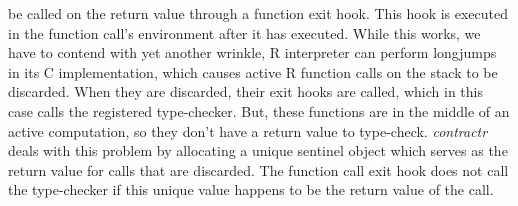 \documentclass[acmsmall,review,anonymous]{acmart}\settopmatter{printfolios=true,printccs=false,printacmref=false}
\newcommand{\contractr}{\emph{contractr}\xspace} %
\begin{document}
\begin{itemize}
  be called on the return value through a function exit hook. This hook is
  executed in the function call's environment after it has executed. While
  this works, we have to contend with yet another wrinkle, R interpreter can
  perform longjumps in its C implementation, which causes active R function
  calls on the stack to be discarded. When they are discarded, their exit
  hooks are called, which in this case calls the registered
  type-checker. But, these functions are in the middle of an active
  computation, so they don't have a return value to type-check. \contractr
  deals with this problem by allocating a unique sentinel object which
  serves as the return value for calls that are discarded. The function call
  exit hook does not call the type-checker if this unique value happens to
  be the return value of the call.
\end{itemize}
%
%
\end{document}
